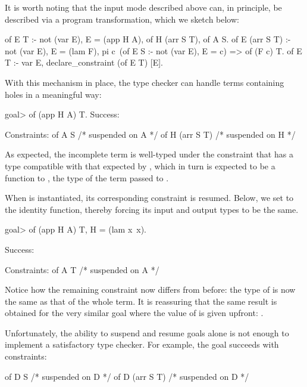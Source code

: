 \documentclass[a4paper, 11pt]{book}
\begin{document}
It is worth noting that the input mode described above can, in principle, be
described via a program transformation, which we sketch below:

\begin{elpicode}
of E T :- not (var E), E = (app H A), of H (arr S T), of A S.
of E (arr S T) :- not (var E), E = (lam F),
  pi c\ (of E S :- not (var E), E = c) => of (F c) T.
of E T :- var E, declare_constraint (of E T) [E].
\end{elpicode}


With this mechanism in place, the type checker can handle terms containing
holes in a meaningful way:

\begin{elpicode}
goal> of (app H A) T.
Success:

Constraints:
  of A S  /* suspended on A */
  of H (arr S T)  /* suspended on H */
\end{elpicode}

As expected, the incomplete term is well-typed under the constraint that
 has a type compatible with that expected by , which in turn
is expected to be a function to , the type of the term passed to
.

When  is instantiated, its corresponding constraint is resumed.
Below, we set  to the identity function, thereby forcing its input
and output types to be the same.

\begin{elpicode}
goal> of (app H A) T, H = (lam x\ x).

Success:

Constraints:
  of A T  /* suspended on A */
\end{elpicode}


Notice how the remaining constraint now differs from before: the type of
 is now the same  as that of the whole term.
It is reassuring that the same result is obtained for the very similar goal
where the value of  is given upfront: .

Unfortunately, the ability to suspend and resume goals alone is not enough to
implement a satisfactory type checker. For example, the goal
 succeeds with constraints:

\begin{elpicode}
  of D S  /* suspended on D */
  of D (arr S T)  /* suspended on D */
\end{elpicode}
\end{document}
